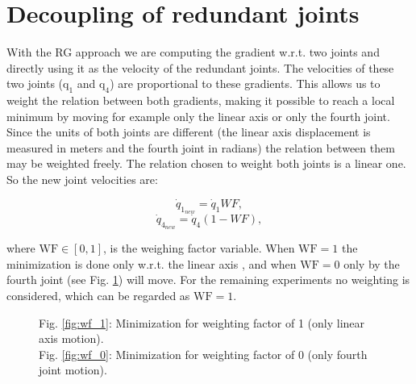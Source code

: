 \section{Decoupling of redundant joints}
\label{sec:Decoupling}
\label{subsubsec:weighting}


With the RG approach we are computing the gradient w.r.t. two joints and directly using it as the velocity of the redundant joints. The velocities of these two joints ($\mathrm{q_1}$ and $\mathrm{q_4}$) are proportional to these gradients. This allows us to weight the relation between both gradients, making it possible to reach a local minimum
by moving for example only the linear axis or only the fourth joint. Since the units of both joints are different (the linear axis displacement is measured in meters and the fourth joint in radians) the relation between them may be weighted freely.
The relation chosen to weight both joints is a linear one. So the new joint velocities are: 

\begin{equation}
	{\dot{q}}_{1_{new}}  = {\dot{q}}_{1}WF,
	\label{eq:decoupling_q1} 
\end{equation} 
\begin{equation}
		{\dot{q}}_{4_{new}} = {\dot{q}}_{4}(1-WF),
	\label{eq:decoupling_q4}
\end{equation}


where $\mathrm{WF \in [0,1]}$, is the weighing factor variable.
When $\mathrm{WF=1}$ the minimization is done only w.r.t. the linear axis , and when $\mathrm{WF=0}$ only by the fourth joint (see Fig. \ref{fig:wf}) will move.
For the  remaining experiments no weighting is considered, which can be regarded as $\mathrm{WF=1}$.

\begin{figure}[!h]
	\centering	
	 	 	 	
	\caption{Fig. \ref{fig:wf_1}:  Minimization for weighting factor of 1 (only  linear axis motion). \\ Fig. \ref{fig:wf_0}: Minimization for weighting factor of 0 (only fourth joint motion). }
	\label{fig:wf}
\end{figure}

